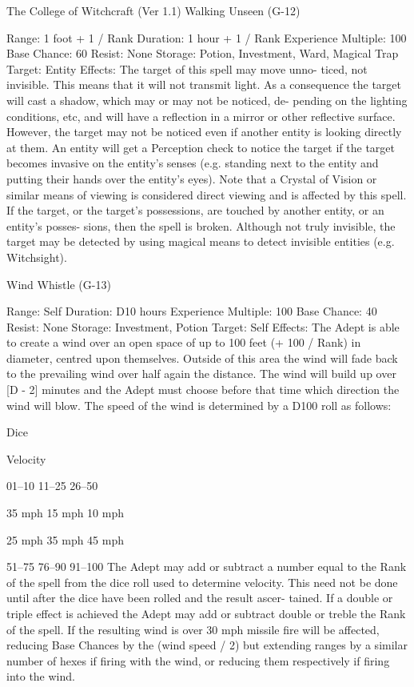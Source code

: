\begin{Chapter}{The College of Witchcraft (Ver 1.1)}
Walking Unseen (G-12) 

Range: 1 foot + 1 / Rank 
Duration: 1 hour + 1 / Rank 
Experience Multiple: 100 
Base Chance: 60%
Resist: None 
Storage: Potion, Investment, Ward, Magical Trap 
Target: Entity 
Effects:  The  target  of  this  spell  may  move  unno-
ticed,  not  invisible.  This  means  that  it  will  not 
transmit light. As a consequence the target will cast 
a  shadow,  which  may  or  may  not  be  noticed,  de-
pending  on  the  lighting  conditions,  etc,  and  will 
have  a  reflection  in  a  mirror  or  other  reflective 
surface.  However,  the  target  may  not  be  noticed 
even  if  another  entity  is  looking  directly  at  them. 
An entity will get a Perception check to notice the 
target if the target becomes invasive on the entity’s 
senses (e.g. standing next to the entity and putting 
their  hands  over  the  entity’s  eyes).  Note  that  a 
Crystal  of  Vision  or  similar  means  of  viewing  is 
considered  direct  viewing  and  is  affected  by  this 
spell.  If  the  target,  or  the  target’s  possessions,  are 
touched  by  another  entity,  or  an  entity’s  posses-
sions,  then  the  spell  is  broken.  Although  not  truly 
invisible,  the  target  may  be  detected  by  using 
magical  means  to  detect  invisible  entities  (e.g. 
Witchsight). 

Wind Whistle (G-13) 

Range: Self 
Duration: D10 hours 
Experience Multiple: 100 
Base Chance: 40%
Resist: None 
Storage: Investment, Potion 
Target: Self 
Effects: The Adept is able to create a wind over an 
open  space  of  up  to  100  feet  (+  100  /  Rank)  in 
diameter, centred upon themselves. Outside of this 
area the wind will fade back to the prevailing wind 
over half again the distance. The wind will build up 
over  [D  -  2]  minutes  and  the  Adept  must  choose 
before  that  time  which  direction  the  wind  will 
blow.  The  speed  of  the  wind  is  determined  by  a 
D100 roll as follows: 

Dice 

Velocity 

01–10 
11–25 
26–50 

35 mph 
15 mph 
10 mph 

25 mph 
35 mph 
45 mph 

51–75 
76–90 
91–100 
The  Adept  may  add  or  subtract  a number  equal to 
the  Rank  of  the  spell  from  the  dice  roll  used  to 
determine  velocity.  This  need  not  be  done  until 
after the dice have been rolled and the result ascer-
tained.  If  a  double  or  triple  effect  is  achieved  the 
Adept  may  add  or  subtract  double  or  treble  the 
Rank  of  the  spell.  If  the  resulting  wind  is  over  30 
mph  missile  fire  will  be  affected,  reducing  Base 
Chances  by  the  (wind  speed  /  2)  but  extending 
ranges  by  a  similar  number  of  hexes  if  firing  with 
the  wind,  or  reducing  them  respectively  if  firing 
into the wind. 


\end{Chapter}
